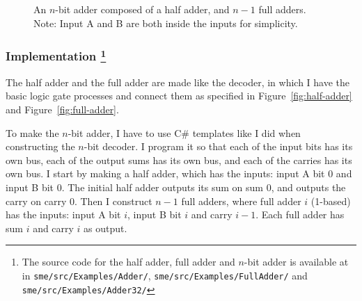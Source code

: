 \begin{figure}
    \centering
    \caption{An $n$-bit adder composed of a half adder, and $n-1$ full adders.
    Note: Input A and B are both inside the inputs for simplicity.}
    \label{fig:n-bit-adder}
\end{figure}

\subsubsection*{Implementation
\footnote{The source code for the half adder, full adder and $n$-bit adder is
available at~\cite{ref:github} in \texttt{sme/src/Examples/Adder/},
\texttt{sme/src/Examples/FullAdder/} and \texttt{sme/src/Examples/Adder32/}}
}
The half adder and the full adder are made like the decoder, in which I have
the basic logic gate processes and connect them as specified in
Figure~\ref{fig:half-adder} and Figure~\ref{fig:full-adder}.

To make the $n$-bit adder, I have to use C\# templates like I did when
constructing the $n$-bit decoder. I program it so that each of the input bits
has its own bus, each of the output sums has its own bus, and each of the
carries has its own bus. I start by making a half adder, which has the
inputs: input A bit 0 and input B bit 0. The initial half adder outputs its sum
on sum 0, and outputs the carry on carry 0. Then I construct $n-1$ full
adders, where full adder $i$ (1-based) has the inputs: input A bit $i$, input
B bit $i$ and carry $i-1$. Each full adder has sum $i$ and carry $i$ as
output.
